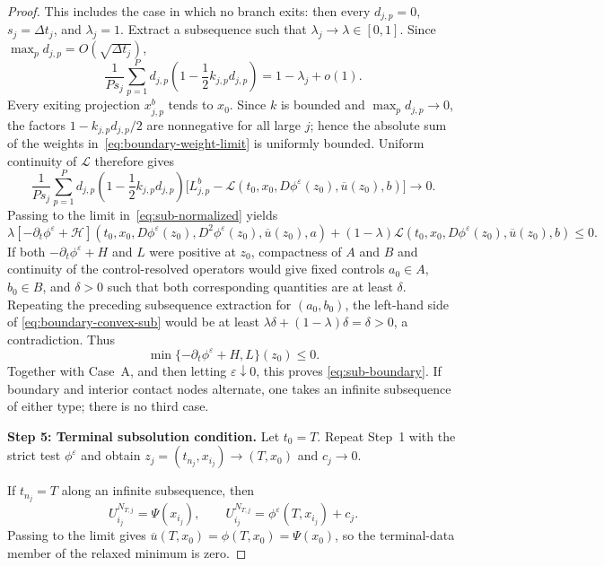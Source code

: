 \documentclass[10pt,a4paper]{amsart}
\newcommand{\dt}{\Delta t}
\begin{document}
\begin{proof}
		This includes the case in which no branch exits: then every $d_{j,p}=0$,
		$s_j=\dt_j$, and $\lambda_j=1$.  Extract a subsequence such that
		$\lambda_j\to\lambda\in[0,1]$.  Since
		$\max_p d_{j,p}=O(\sqrt{\dt_j})$,
		\begin{equation}
			\frac1{Ps_j}\sum_{p=1}^P d_{j,p}
			\left(1-\frac12k_{j,p}d_{j,p}\right)
			=1-\lambda_j+o(1).
			\label{eq:boundary-weight-limit}
		\end{equation}
		Every exiting projection $x_{j,p}^b$ tends to $x_0$.  Since $k$ is bounded
		and $\max_p d_{j,p}\to0$, the factors
		$1-k_{j,p}d_{j,p}/2$ are nonnegative for all large $j$; hence the absolute
		sum of the weights in~\eqref{eq:boundary-weight-limit} is uniformly
		bounded.  Uniform continuity of $\mathcal L$ therefore gives
		\[
		\frac1{Ps_j}\sum_{p=1}^P d_{j,p}
		\left(1-\frac12k_{j,p}d_{j,p}\right)
		\bigl[L_{j,p}^b-\mathcal L(t_0,x_0,D\phi^\varepsilon(z_0),
		\overline u(z_0),b)\bigr]\longrightarrow0.
		\]
		Passing to the limit in~\eqref{eq:sub-normalized} yields
		\begin{equation}
			\lambda[-\partial_t\phi^\varepsilon+\mathcal H]
			(t_0,x_0,D\phi^\varepsilon(z_0),D^2\phi^\varepsilon(z_0),
			\overline u(z_0),a)
			+(1-\lambda)\mathcal L(t_0,x_0,D\phi^\varepsilon(z_0),
			\overline u(z_0),b)\le0.
			\label{eq:boundary-convex-sub}
		\end{equation}
		If both $-\partial_t\phi^\varepsilon+H$ and $L$ were positive at $z_0$,
		compactness of $A$ and $B$ and continuity of the control-resolved operators
		would give fixed controls $a_0\in A$, $b_0\in B$, and $\delta>0$ such that
		both corresponding quantities are at least $\delta$.  Repeating the
		preceding subsequence extraction for $(a_0,b_0)$, the left-hand side of
		\eqref{eq:boundary-convex-sub} would be at least
		$\lambda\delta+(1-\lambda)\delta=\delta>0$, a contradiction.  Thus
		\[
		\min\{-\partial_t\phi^\varepsilon+H,L\}(z_0)\le0.
		\]
		Together with Case~A, and then letting $\varepsilon\downarrow0$, this proves
		\eqref{eq:sub-boundary}.  If boundary and interior contact nodes alternate,
		one takes an infinite subsequence of either type; there is no third case.
		
		\medskip
		\noindent\textbf{Step 5: Terminal subsolution condition.}
		Let $t_0=T$.  Repeat Step~1 with the strict test
		$\phi^\varepsilon$ and obtain $z_j=(t_{n_j},x_{i_j})\to(T,x_0)$ and
		$c_j\to0$.
		
		If $t_{n_j}=T$ along an infinite subsequence, then
		\[
		U_{i_j}^{N_{T,j}}=\Psi(x_{i_j}),\qquad
		U_{i_j}^{N_{T,j}}=\phi^\varepsilon(T,x_{i_j})+c_j.
		\]
		Passing to the limit gives
		$\overline u(T,x_0)=\phi(T,x_0)=\Psi(x_0)$, so the terminal-data member of
		the relaxed minimum is zero.
		

\end{proof}
\end{document}
